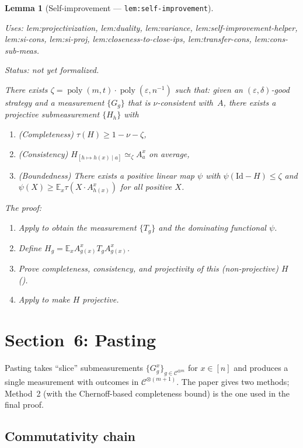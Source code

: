 \documentclass{article}
\providecommand{\uses}[1]{\par\smallskip\noindent\emph{Uses:} #1.\par\smallskip}
\providecommand{\notready}{\par\smallskip\noindent\emph{Status: not yet formalized.}\par\smallskip}
\newtheorem{lemma}[definition]{Lemma}
\theoremstyle{remark}
\newcommand{\E}{\mathbb{E}}
\newcommand{\id}{\mathrm{Id}}
\newcommand{\code}{\mathcal{C}}
\newcommand{\eps}{\varepsilon}
\begin{document}
\begin{lemma}[Self-improvement --- \texttt{lem:self-improvement}]
	\label{lem:self-improvement}
	\uses{lem:projectivization, lem:duality, lem:variance,
		lem:self-improvement-helper, lem:si-cons, lem:si-proj,
		lem:closeness-to-close-ips, lem:transfer-cons, lem:cons-sub-meas}
	\notready
	There exists $\zeta=\operatorname{poly}(m,t)\cdot\operatorname{poly}(\eps,n^{-1})$
	such that:
	given an $(\eps,\delta)$-good strategy and a measurement $\{G_g\}$ that is
	$\nu$-consistent with~$A$, there exists a projective submeasurement $\{H_h\}$ with
	\begin{enumerate}
		\item (Completeness) $\tau(H)\ge 1-\nu-\zeta$,
		\item (Consistency) $H_{[h\mapsto h(x)\mid a]}\simeq_\zeta A^x_a$ on average,
		\item (Boundedness) There exists a positive linear map $\psi$ with
		      $\psi(\id-H)\le\zeta$ and
		      $\psi(X)\ge\E_x\tau(X\cdot A^x_{h(x)})$ for all positive $X$.
	\end{enumerate}
	The proof:
	\begin{enumerate}[label=Step~\arabic*:]
		\item Apply  to obtain the measurement $\{T_g\}$ and the
		      dominating functional $\psi$.
		\item Define $H_g=\E_x A^x_{g(x)}T_g A^x_{g(x)}$.
		\item Prove completeness, consistency, and projectivity of this (non-projective) $H$
		      ().
		\item Apply  to make $H$ projective.
	\end{enumerate}
\end{lemma}

\section{Section~6: Pasting}
\label{sec:pasting}

Pasting takes ``slice'' submeasurements $\{G^x_g\}_{g\in\code^{\otimes m}}$
for $x\in[n]$ and produces a single measurement with outcomes in
$\code^{\otimes(m+1)}$. The paper gives two methods; Method~2 (with the
Chernoff-based completeness bound) is the one used in the final proof.

\subsection{Commutativity chain}
\end{document}
